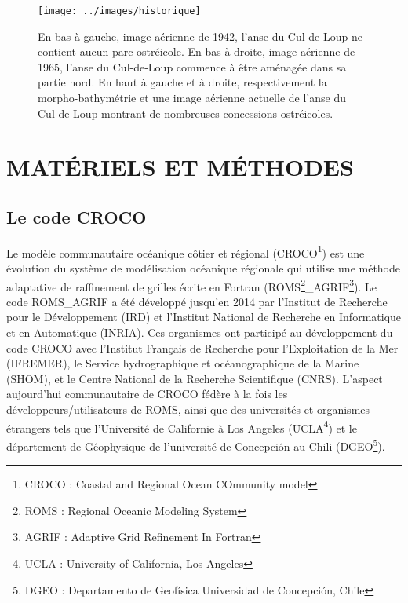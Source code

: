 \documentclass[10pt,a4paper,titlepage]{article}
\begin{document}
    \begin{figure}[!h]
        \centering
        \texttt{[image: ../images/historique]}
        \caption[Évolution de l'anse du Cul-de-Loup]{En bas à gauche, image aérienne de 1942, l'anse du Cul-de-Loup ne contient aucun parc ostréicole. En bas à droite, image aérienne de 1965, l'anse du Cul-de-Loup commence à être aménagée dans sa partie nord. En haut à gauche et à droite, respectivement la morpho-bathymétrie  et une image aérienne actuelle de l'anse du Cul-de-Loup montrant de nombreuses concessions ostréicoles. \parencite{geoportail}}
        \label{fig:historique-adcl}
    \end{figure}



    \newpage

    \section{MATÉRIELS ET MÉTHODES}
    \label{sec:materiel_methodes}

    \subsection{Le code CROCO}
    \label{sub:croco}
    Le modèle communautaire océanique côtier et régional (CROCO\footnote{CROCO : Coastal and Regional Ocean COmmunity model}) est une évolution du système de modélisation océanique régionale qui utilise une méthode adaptative de raffinement de grilles écrite en Fortran (ROMS\footnote{ROMS : Regional Oceanic Modeling System}\_AGRIF\footnote{AGRIF : Adaptive Grid Refinement In Fortran}).
    Le code ROMS\_AGRIF a été développé jusqu'en 2014 par l'Institut de Recherche pour le Développement (IRD) et l'Institut National de Recherche en Informatique et en Automatique (INRIA). Ces organismes ont participé au développement du code CROCO avec
    l'Institut Français de Recherche pour l'Exploitation de la Mer (IFREMER),
    le Service hydrographique et océanographique de la Marine (SHOM),
    et le Centre National de la Recherche Scientifique (CNRS).
    L'aspect aujourd'hui communautaire de CROCO fédère à la fois les développeurs/utilisateurs de ROMS, ainsi que des universités et organismes étrangers tels que l'Université de Californie à Los Angeles (UCLA\footnote{UCLA : University of California, Los Angeles})
    et le département de Géophysique de l'université de Concepción au Chili (DGEO\footnote{DGEO : Departamento de Geofísica Universidad de Concepción, Chile}).
\end{document}
